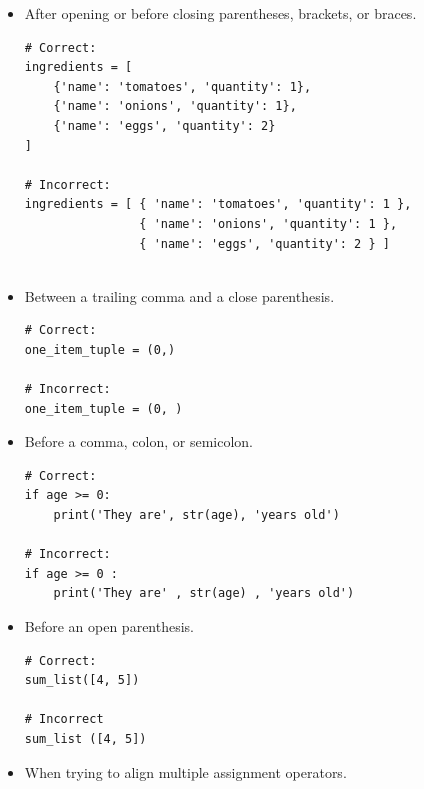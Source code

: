 \documentclass{tufte-handout}
\begin{document}
\begin{itemize}
	\item After opening or before closing parentheses, brackets, or braces.
	
\begin{mdframed}
\begin{verbatim}
# Correct:
ingredients = [
    {'name': 'tomatoes', 'quantity': 1},
    {'name': 'onions', 'quantity': 1},
    {'name': 'eggs', 'quantity': 2}
]
	
# Incorrect:
ingredients = [ { 'name': 'tomatoes', 'quantity': 1 },
                { 'name': 'onions', 'quantity': 1 },
                { 'name': 'eggs', 'quantity': 2 } ]
	
\end{verbatim}
\end{mdframed}
	
	\item Between a trailing comma and a close parenthesis.
	
\begin{mdframed}
\begin{verbatim}
# Correct:
one_item_tuple = (0,)

# Incorrect:
one_item_tuple = (0, )		
\end{verbatim}
\end{mdframed}

	\item Before a comma, colon, or semicolon.
	
\begin{mdframed}
\begin{verbatim}
# Correct:
if age >= 0: 
    print('They are', str(age), 'years old')
		
# Incorrect:
if age >= 0 : 
    print('They are' , str(age) , 'years old')	
\end{verbatim}
\end{mdframed}

	\item Before an open parenthesis.
	
\begin{mdframed}
\begin{verbatim}
# Correct:
sum_list([4, 5])

# Incorrect
sum_list ([4, 5])
\end{verbatim}
\end{mdframed}

	\item When trying to align multiple assignment operators.
	

\end{itemize}
\end{document}
